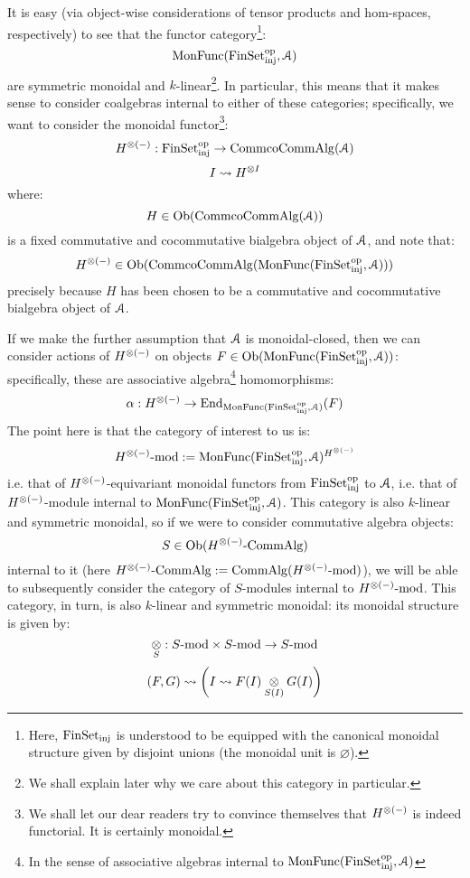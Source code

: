             \begin{remark}
                It is easy (via object-wise considerations of tensor products and hom-spaces, respectively) to see that the functor category\footnote{Here, $\mathrm{Fin}\mathrm{Set}_{\mathrm{inj}}$ is understood to be equipped with the canonical monoidal structure given by disjoint unions (the monoidal unit is $\varnothing$).}:
                    $$\mathrm{Mon}\mathrm{Func}(\mathrm{Fin}\mathrm{Set}_{\mathrm{inj}}^{\mathrm{op}}, \mathcal{A})$$
                are symmetric monoidal and $k$-linear\footnote{We shall explain later why we care about this category in particular.}. In particular, this means that it makes sense to consider coalgebras internal to either of these categories; specifically, we want to consider the monoidal functor\footnote{We shall let our dear readers try to convince themselves that $H^{\tensor (-)}$ is indeed functorial. It is certainly monoidal.}:
                    $$H^{\tensor (-)}: \Fin\Sets_{\inj}^{\op} \to \Comm\co\Comm\Alg(\calA)$$
                    $$I \mapsto H^{\tensor I}$$
                where:
                    $$H \in \mathrm{Ob}(\mathrm{Comm}\mathrm{co}\mathrm{Comm}\mathrm{Alg}(\mathcal{A}))$$
                is a fixed commutative and cocommutative bialgebra object of $\mathcal{A}$, and note that:
                    $$H^{\tensor (-)} \in \Ob(\Comm\co\Comm\Alg(\Mon\Func(\Fin\Sets_{\inj}^{\op}, \calA)))$$
                precisely because $H$ has been chosen to be a commutative and cocommutative bialgebra object of $\mathcal{A}$. 
                
                If we make the further assumption that $\mathcal{A}$ is monoidal-closed, then we can consider actions of $H^{\tensor (-)}$ on objects $F \in \mathrm{Ob}(\mathrm{Mon}\mathrm{Func}(\mathrm{Fin}\mathrm{Set}_{\mathrm{inj}}^{\mathrm{op}}, \mathcal{A}))$: specifically, these are associative algebra\footnote{In the sense of associative algebras internal to $\mathrm{Mon}\mathrm{Func}(\mathrm{Fin}\mathrm{Set}_{\mathrm{inj}}^{\mathrm{op}}, \mathcal{A})$} homomorphisms:
                    $$\alpha: H^{\tensor (-)} \to \End_{\Mon\Func(\Fin\Sets_{\inj}^{\op}, \calA)}(F)$$
                The point here is that the category of interest to us is:
                    $$H^{\tensor (-)}\mod := \Mon\Func(\Fin\Sets_{\inj}^{\op}, \calA)^{H^{\tensor (-)}}$$
                i.e. that of $H^{\tensor (-)}$-equivariant monoidal functors from $\mathrm{Fin}\mathrm{Set}_{\mathrm{inj}}^{\mathrm{op}}$ to $\mathcal{A}$, i.e. that of $H^{\tensor (-)}$-module internal to $\mathrm{Mon}\mathrm{Func}(\mathrm{Fin}\mathrm{Set}_{\mathrm{inj}}^{\mathrm{op}}, \mathcal{A})$. This category is also $k$-linear and symmetric monoidal, so if we were to consider commutative algebra objects:
                    $$S \in \Ob(H^{\tensor (-)}\-\Comm\Alg)$$
                internal to it (here $H^{\tensor (-)}\-\Comm\Alg := \Comm\Alg(H^{\tensor (-)}\mod)$), we will be able to subsequently consider the category of $S$-modules internal to $H^{\tensor (-)}\mod$. This category, in turn, is also $k$-linear and symmetric monoidal: its monoidal structure is given by:
                    $$\tensor_S: S\mod \x S\mod \to S\mod$$
                    $$(F, G) \mapsto \left(I \mapsto F(I) \tensor_{S(I)} G(I)\right)$$
            \end{remark}
